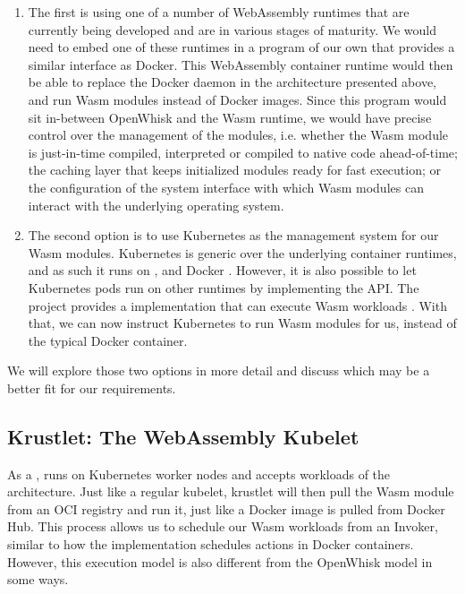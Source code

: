 \begin{enumerate}
    \item The first is using one of a number of WebAssembly runtimes that are currently being developed and are in various stages of maturity. We would need to embed one of these runtimes in a program of our own that provides a similar interface as Docker. This WebAssembly container runtime would then be able to replace the Docker daemon in the architecture presented above, and run Wasm modules instead of Docker images. Since this program would sit in-between OpenWhisk and the Wasm runtime, we would have precise control over the management of the modules, i.e. whether the Wasm module is just-in-time compiled, interpreted or compiled to native code ahead-of-time; the caching layer that keeps initialized modules ready for fast execution; or the configuration of the system interface with which Wasm modules can interact with the underlying operating system.
    \item The second option is to use Kubernetes as the management system for our Wasm modules. Kubernetes is generic over the underlying container runtimes, and as such it runs on ,  and Docker \cite{Kub2021}. However, it is also possible to let Kubernetes pods run on other runtimes by implementing the  API. The  project provides a  implementation that can execute Wasm workloads \cite{Krustlet2021}. With that, we can now instruct Kubernetes to run Wasm modules for us, instead of the typical Docker container.
\end{enumerate}

We will explore those two options in more detail and discuss which may be a better fit for our requirements.

\subsection{Krustlet: The WebAssembly Kubelet}

As a ,  runs on Kubernetes worker nodes and accepts workloads of the  architecture. Just like a regular kubelet, krustlet will then pull the Wasm module from an OCI registry and run it, just like a Docker image is pulled from Docker Hub. This process allows us to schedule our Wasm workloads from an Invoker, similar to how the  implementation schedules actions in Docker containers. However, this execution model is also different from the OpenWhisk model in some ways.

